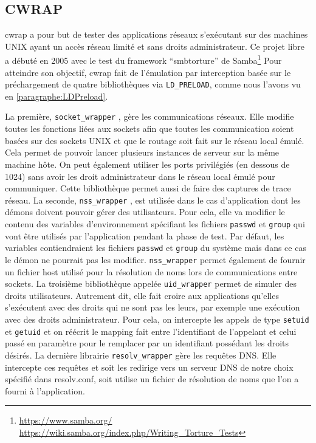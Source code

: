 \subsection{CWRAP}
\label{subsection:cwrap}

cwrap\citep{cwrap, cwrap_bis} a pour but de tester des applications réseaux
s'exécutant sur des machines UNIX ayant un accès réseau limité et sans droits
administrateur. Ce projet libre a débuté en 2005 avec le test du framework ``smbtorture''
de Samba\footnote{\url{https://www.samba.org/}
  \\ \url{https://wiki.samba.org/index.php/Writing\_Torture\_Tests}} Pour
atteindre son objectif, cwrap fait de l'émulation par interception basée sur le
préchargement de quatre bibliothèques via \texttt{LD\_PRELOAD}, comme nous
l'avons vu en \ref{paragraphe:LDPreload}.

La première, \texttt{socket\_wrapper} \citep{cwrap}, gère les communications
réseaux. Elle modifie toutes les fonctions liées aux sockets afin que toutes les
communication soient basées sur des sockets UNIX et que le routage soit fait sur
le réseau local émulé. Cela permet de pouvoir lancer plusieurs instances de
serveur sur la même machine hôte. On peut également utiliser les ports
privilégiés (en dessous de 1024) sans avoir les droit administrateur dans le réseau local
émulé pour communiquer. Cette bibliothèque permet aussi de faire des captures de
trace réseau. La seconde, \texttt{nss\_wrapper} \citep{cwrap}, est utilisée dans
le cas d'application dont les démons doivent pouvoir gérer des
utilisateurs. Pour cela, elle va modifier le contenu des variables
d'environnement spécifiant les fichiers \texttt{passwd} et \texttt{group} qui vont être utilisés
par l'application pendant la phase de test. Par défaut, les variables
contiendraient les fichiers \texttt{passwd} et \texttt{group} du système mais dans ce cas le démon
ne pourrait pas les modifier. \texttt{nss\_wrapper} permet également de fournir
un fichier host utilisé pour la résolution de noms lors de communications entre
sockets. La troisième bibliothèque appelée \texttt{uid\_wrapper} \citep{cwrap}
permet de simuler des droits utilisateurs. Autrement dit, elle fait croire aux
applications qu'elles s'exécutent avec des droits qui ne sont pas les leurs, par
exemple une exécution avec des droits administrateur. Pour cela, on intercepte les appels
de type \texttt{setuid} et \texttt{getuid} et on réécrit le mapping fait entre l'identifiant de
l'appelant et celui passé en paramètre pour le remplacer par un identifiant
possédant les droits désirés. La dernière librairie \texttt{resolv\_wrapper}
\citep{cwrap} gère les requêtes DNS. Elle intercepte ces requêtes et soit les
redirige vers un serveur DNS de notre choix spécifié dans resolv.conf, soit
utilise un fichier de résolution de noms que l'on a fourni à l'application.

